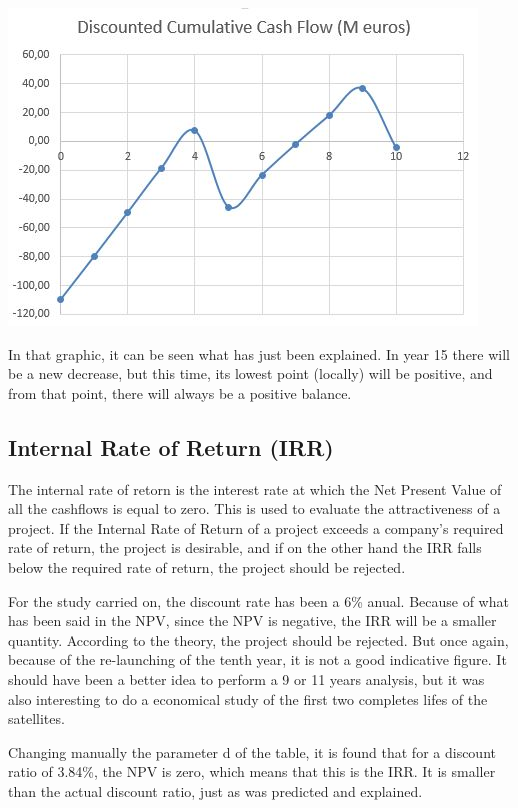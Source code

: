 \includegraphics{DCCF.jpg}

In that graphic, it can be seen what has just been explained. In year 15 there will be a new decrease, but this time, its lowest point (locally) will be positive, and from that point, there will always be a positive balance. 

\subsection{Internal Rate of Return (IRR)}
The internal rate of retorn is the interest rate at which the Net Present Value of all the cashflows is equal to zero. This is used to evaluate the attractiveness of a project. If the Internal Rate of Return of a project exceeds a company's required rate of return, the project is desirable, and if on the other hand the IRR falls below the required rate of return, the project should be rejected.

For the study carried on, the discount rate has been a 6\% anual. Because of what has been said in the NPV, since the NPV is negative, the IRR will be a smaller quantity. According to the theory, the project should be rejected. But once again, because of the re-launching of the tenth year, it is not a good indicative figure. It should have been a better idea to perform a 9 or 11 years analysis, but it was also interesting to do a economical study of the first two completes lifes of the satellites. 

Changing manually the parameter d of the table, it is found that for a discount ratio of 3.84\%, the NPV is zero, which means that this is the IRR. It is smaller than the actual discount ratio, just as was predicted and explained. 








